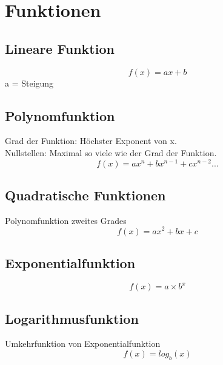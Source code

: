 \documentclass[../main.tex]{subfiles}
\begin{document}

\chapter{Funktionen}
\section{Lineare Funktion}
\[f(x)=ax+b\]
a = Steigung

\section{Polynomfunktion}
Grad der Funktion: Höchster Exponent von x. \\
Nullstellen: Maximal so viele wie der Grad der Funktion. 
\[f(x)=ax^n+bx^{n-1}+cx^{n-2}...\]

\section{Quadratische Funktionen}
Polynomfunktion zweites Grades
\[f(x)=ax^2+bx+c\]

\section{Exponentialfunktion}
\[f(x)=a \times b^x\]


\section{Logarithmusfunktion}
Umkehrfunktion von Exponentialfunktion
\[f(x)=log_b(x)\]
\end{document}
